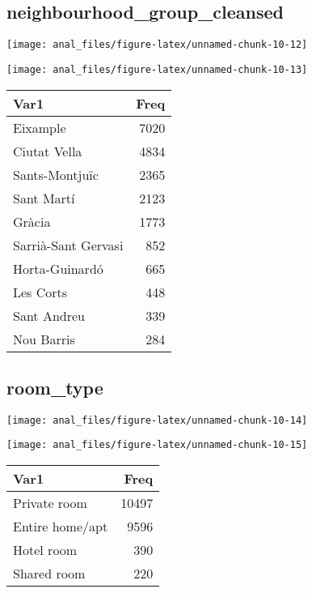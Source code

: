\hypertarget{neighbourhood_group_cleansed}{%
\subsection{neighbourhood\_group\_cleansed}\label{neighbourhood_group_cleansed}}

\begin{center}\texttt{[image: anal\_files/figure-latex/unnamed-chunk-10-12]} \end{center}

\begin{center}\texttt{[image: anal\_files/figure-latex/unnamed-chunk-10-13]} \end{center}

\begin{table}[H]
\centering
\begin{tabular}[t]{lr}
\toprule
Var1 & Freq\\
\midrule
Eixample & 7020\\
Ciutat Vella & 4834\\
Sants-Montjuïc & 2365\\
Sant Martí & 2123\\
Gràcia & 1773\\
\addlinespace
Sarrià-Sant Gervasi & 852\\
Horta-Guinardó & 665\\
Les Corts & 448\\
Sant Andreu & 339\\
Nou Barris & 284\\
\bottomrule
\end{tabular}
\end{table}
\pagebreak

\hypertarget{room_type}{%
\subsection{room\_type}\label{room_type}}

\begin{center}\texttt{[image: anal\_files/figure-latex/unnamed-chunk-10-14]} \end{center}

\begin{center}\texttt{[image: anal\_files/figure-latex/unnamed-chunk-10-15]} \end{center}

\begin{table}[H]
\centering
\begin{tabular}[t]{lr}
\toprule
Var1 & Freq\\
\midrule
Private room & 10497\\
Entire home/apt & 9596\\
Hotel room & 390\\
Shared room & 220\\
\bottomrule
\end{tabular}
\end{table}
\pagebreak

